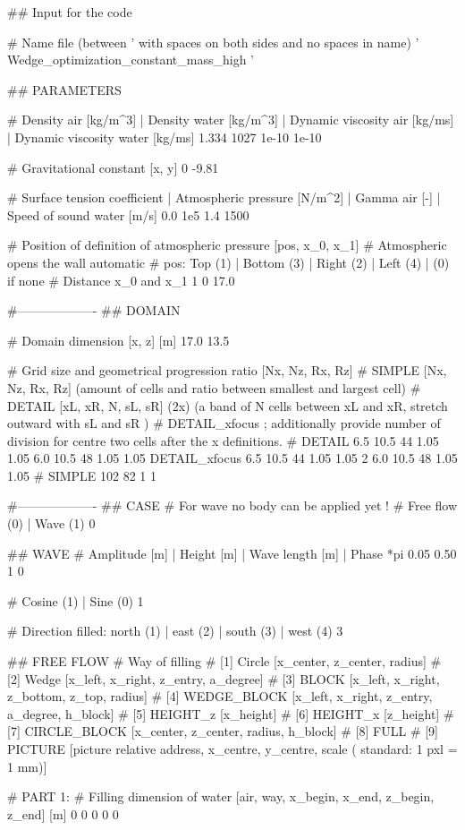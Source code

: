 ## Input for the code

# Name file (between ' with spaces on both sides and no spaces in name)
' Wedge_optimization_constant_mass_high '

## PARAMETERS

# Density air [kg/m^3] | Density water [kg/m^3] | Dynamic viscosity air [kg/ms] | Dynamic viscosity water [kg/ms]
1.334 1027 1e-10 1e-10

# Gravitational constant [x, y]
0 -9.81

# Surface tension coefficient | Atmospheric pressure [N/m^2] | Gamma air [-]	| Speed of sound water [m/s]
0.0 	1e5 	1.4		1500

# Position of definition of atmospheric pressure [pos, x_0, x_1]
# Atmospheric opens the wall automatic
# pos: Top (1)	| Bottom (3)	| Right (2)		| Left (4) | (0) if none
# Distance x_0 and x_1
1 0 17.0

#-------------------
## DOMAIN

# Domain dimension [x, z] [m]
17.0 13.5

# Grid size and geometrical progression ratio [Nx, Nz, Rx, Rz]
# SIMPLE [Nx, Nz, Rx, Rz] (amount of cells and ratio between smallest and largest cell)
# DETAIL [xL, xR, N, sL, sR] (2x) (a band of N cells between xL and xR, stretch outward with sL and sR )
# DETAIL_xfocus ; additionally provide number of division for centre two cells after the x definitions.
# DETAIL 6.5 10.5 44 1.05 1.05 6.0 10.5 48 1.05 1.05
DETAIL_xfocus 6.5 10.5 44 1.05 1.05 2 6.0 10.5 48 1.05 1.05
# SIMPLE 102 82 1 1

#-------------------
## CASE
# For wave no body can be applied yet !
# Free flow (0)	| Wave (1)
0

## WAVE
# Amplitude [m] | Height [m]	| Wave length [m]	| Phase *pi
0.05 	0.50		1		0

# Cosine (1)	| Sine (0)
1

# Direction filled: north (1)	| east (2)	|	south (3)	| west (4)
3

## FREE FLOW
# Way of filling
# [1] Circle        [x_center, z_center, radius]
# [2] Wedge         [x_left, x_right, z_entry, a_degree]
# [3] BLOCK 		[x_left, x_right, z_bottom, z_top, radius]
# [4] WEDGE_BLOCK   [x_left, x_right, z_entry, a_degree, h_block]
# [5] HEIGHT_z      [x_height]
# [6] HEIGHT_x      [z_height]
# [7] CIRCLE_BLOCK  [x_center, z_center, radius, h_block]
# [8] FULL
# [9] PICTURE		[picture relative address, x_centre, y_centre, scale ( standard: 1 pxl = 1 mm)]

# PART 1:
# Filling dimension of water [air, way, x_begin, x_end, z_begin, z_end] [m]
0 0 0 0 0

